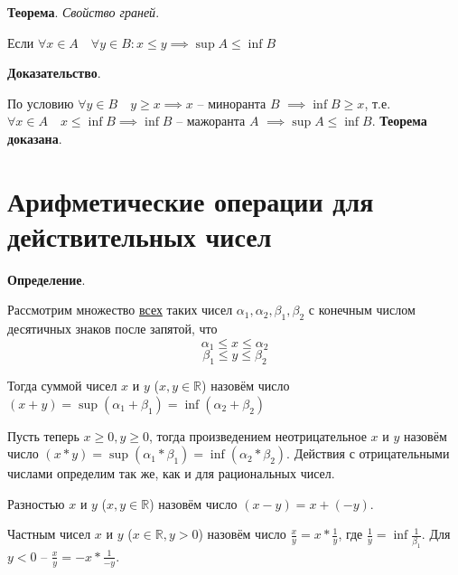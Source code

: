 \documentclass{article}
\newcommand{\parspace}{\vspace{10pt}}
\theoremstyle{break}
\begin{document}
\parspace

\textbf{Теорема}. \textit{Свойство граней}.

Если $\forall x \in A \quad \forall y \in B: x \le y \implies \sup A \le \inf B$

\textbf{Доказательство}.

По условию $\forall y \in B \quad y \ge x \implies x$ -- миноранта $B$
$\implies \inf B \ge x$, т.е. $\forall x \in A \quad x \le \inf B \implies \inf B$ --
мажоранта $A$ $\implies \sup A \le \inf B$. \textbf{Теорема доказана}.

\section{Арифметические операции для действительных чисел}

\textbf{Определение}.

Рассмотрим множество \underline{всех} таких чисел
$\alpha_1, \alpha_2, \beta_1, \beta_2$ с конечным числом десятичных знаков
после запятой, что
\[\alpha_1 \le x \le \alpha_2\]
\[\beta_1 \le y \le \beta_2\]

Тогда суммой чисел $x$ и $y$ ($x, y \in \mathbb{R}$) назовём число 
$(x + y) = \sup (\alpha_1 + \beta_1) = \inf (\alpha_2 + \beta_2)$

Пусть теперь $x \ge 0, y \ge 0$, тогда произведением неотрицательное $x$ и $y$
назовём число $(x * y) = \sup (\alpha_1 * \beta_1) = \inf (\alpha_2 * \beta_2)$.
Действия с отрицательными числами определим так же, как и для рациональных чисел.

Разностью $x$ и $y$ ($x, y \in \mathbb{R}$) назовём число $(x - y) = x + (-y)$.

Частным чисел $x$ и $y$ ($x \in \mathbb{R}, y > 0$) назовём число 
$\frac{x}{y} = x * \frac{1}{y}$, где $\frac{1}{y} = \inf \frac{1}{\beta_1}$.
Для $y < 0$ -- $\frac{x}{y} = -x * \frac{1}{-y}$.

\parspace
\end{document}
